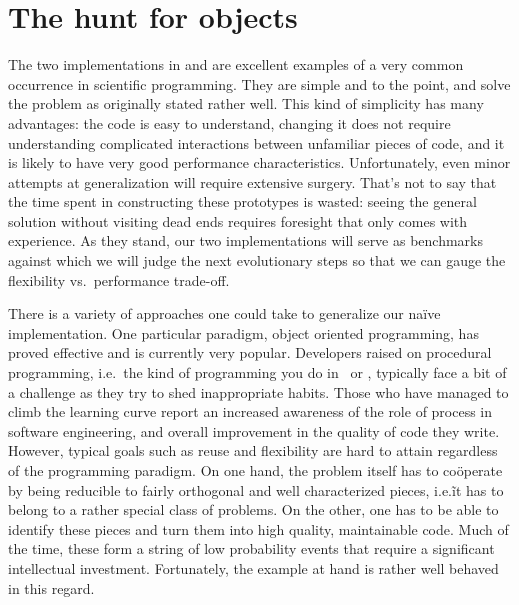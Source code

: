 %
%

\section{The hunt for objects}
\label{sec:classes}

The two implementations in  and  are excellent examples
of a very common occurrence in scientific programming. They are simple and to the point, and
solve the problem as originally stated rather well.  This kind of simplicity has many
advantages: the code is easy to understand, changing it does not require understanding
complicated interactions between unfamiliar pieces of code, and it is likely to have very good
performance characteristics. Unfortunately, even minor attempts at generalization will require
extensive surgery. That's not to say that the time spent in constructing these prototypes is
wasted: seeing the general solution without visiting dead ends requires foresight that only
comes with experience. As they stand, our two implementations will serve as benchmarks against
which we will judge the next evolutionary steps so that we can gauge the flexibility
vs.~performance trade-off.

There is a variety of approaches one could take to generalize our na\"ive implementation. One
particular paradigm, object oriented programming\supercite{meyer-97}, has proved effective and
is currently very popular. Developers raised on procedural programming, i.e.~the kind of
programming you do in \cc\ or \fortran, typically face a bit of a challenge as they try to shed
inappropriate habits. Those who have managed to climb the learning curve report an increased
awareness of the role of process in software engineering, and overall improvement in the
quality of code they write. However, typical goals such as reuse and flexibility are hard to
attain regardless of the programming paradigm. On one hand, the problem itself has to
co\"operate by being reducible to fairly orthogonal and well characterized pieces, i.e.\~ it
has to belong to a rather special class of problems. On the other, one has to be able to
identify these pieces and turn them into high quality, maintainable code. Much of the time,
these form a string of low probability events that require a significant intellectual
investment. Fortunately, the example at hand is rather well behaved in this regard.

